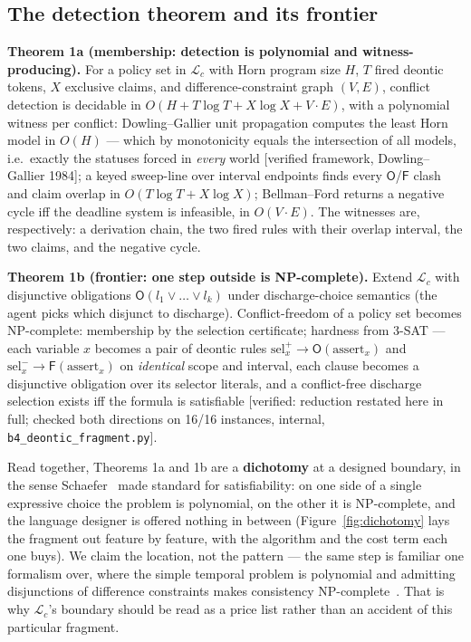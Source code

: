 \documentclass[11pt,a4paper]{article}
\newcommand{\Ob}{\mathsf{O}}
\newcommand{\Fb}{\mathsf{F}}
\begin{document}
\subsection*{The detection theorem and its frontier}
\begin{thebox}
\textbf{Theorem 1a (membership: detection is polynomial and witness-producing).} For a policy set in $\mathcal{L}_c$ with Horn
program size $H$, $T$ fired deontic tokens, $X$ exclusive claims, and difference-constraint graph $(V,E)$, conflict detection is
decidable in $O(H + T\log T + X\log X + V\!\cdot\!E)$, with a polynomial witness per conflict: Dowling--Gallier unit propagation
computes the least Horn model in $O(H)$ --- which by monotonicity equals the intersection of all models, i.e.\ exactly the
statuses forced in \emph{every} world [verified framework, Dowling--Gallier 1984]; a keyed sweep-line over interval endpoints
finds every $\Ob$/$\Fb$ clash and claim overlap in $O(T\log T + X\log X)$; Bellman--Ford returns a negative cycle iff the deadline
system is infeasible, in $O(V\!\cdot\!E)$. The witnesses are, respectively: a derivation chain, the two fired rules with their
overlap interval, the two claims, and the negative cycle.

\textbf{Theorem 1b (frontier: one step outside is NP-complete).} Extend $\mathcal{L}_c$ with disjunctive obligations
$\Ob(l_1\vee\dots\vee l_k)$ under discharge-choice semantics (the agent picks which disjunct to discharge). Conflict-freedom of a
policy set becomes NP-complete: membership by the selection certificate; hardness from 3-SAT --- each variable $x$ becomes a pair
of deontic rules $\mathrm{sel}_x^{+} \to \Ob(\mathrm{assert}_x)$ and $\mathrm{sel}_x^{-} \to \Fb(\mathrm{assert}_x)$ on
\emph{identical} scope and interval, each clause becomes a disjunctive obligation over its selector literals, and a conflict-free
discharge selection exists iff the formula is satisfiable [verified: reduction restated here in full; checked both directions on
16/16 instances, internal, \texttt{b4\_deontic\_fragment.py}].
\end{thebox}



Read together, Theorems 1a and 1b are a \textbf{dichotomy} at a designed boundary, in the sense Schaefer~\cite{schaefer78}
made standard for satisfiability: on one side of a single expressive choice the problem is polynomial, on the other it is
NP-complete, and the language designer is offered nothing in between (Figure~\ref{fig:dichotomy} lays the fragment out feature by
feature, with the algorithm and the cost term each one buys). We claim the location, not the pattern --- the same
step is familiar one formalism over, where the simple temporal problem is polynomial and admitting disjunctions of
difference constraints makes consistency NP-complete~\cite{dmp91,sk00}. That is why $\mathcal{L}_c$'s boundary should be read as a
price list rather than an accident of this particular fragment.
\end{document}

